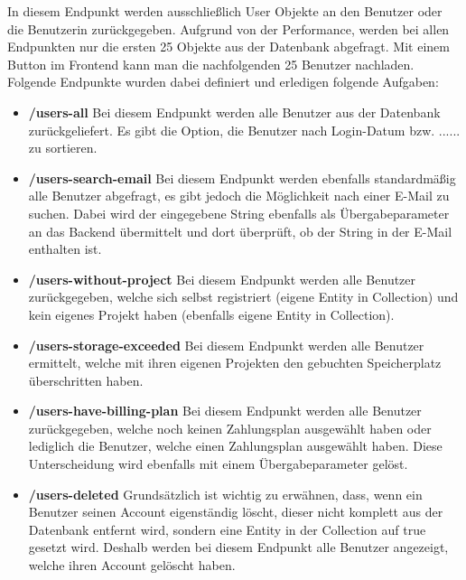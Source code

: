 In diesem Endpunkt werden ausschließlich User Objekte an den Benutzer oder die Benutzerin zurückgegeben. Aufgrund von der Performance, werden bei allen Endpunkten nur die ersten 25 Objekte aus der Datenbank abgefragt. Mit einem Button im Frontend kann man die nachfolgenden 25 Benutzer nachladen. Folgende Endpunkte wurden dabei definiert und erledigen folgende Aufgaben:
\begin{itemize}
    \item \textbf{/users-all}
        \newline
        Bei diesem Endpunkt werden alle Benutzer aus der Datenbank zurückgeliefert. Es gibt die Option, die Benutzer nach Login-Datum bzw. ...... zu sortieren.
    \item \textbf{/users-search-email}
        \newline
        Bei diesem Endpunkt werden ebenfalls standardmäßig alle Benutzer abgefragt, es gibt jedoch die Möglichkeit nach einer E-Mail zu suchen. Dabei wird der eingegebene String ebenfalls als Übergabeparameter an das Backend übermittelt und dort überprüft, ob der String in der E-Mail enthalten ist.
    \item \textbf{/users-without-project}
        \newline
        Bei diesem Endpunkt werden alle Benutzer zurückgegeben, welche sich selbst registriert (eigene Entity in Collection) und kein eigenes Projekt haben (ebenfalls eigene Entity in Collection).
    \item \textbf{/users-storage-exceeded}
        \newline
        Bei diesem Endpunkt werden alle Benutzer ermittelt, welche mit ihren eigenen Projekten den gebuchten Speicherplatz überschritten haben.
    \item \textbf{/users-have-billing-plan}
        \newline
        Bei diesem Endpunkt werden alle Benutzer zurückgegeben, welche noch keinen Zahlungsplan ausgewählt haben oder lediglich die Benutzer, welche einen Zahlungsplan ausgewählt haben. Diese Unterscheidung wird ebenfalls mit einem Übergabeparameter gelöst.
    \item \textbf{/users-deleted}
        \newline
        Grundsätzlich ist wichtig zu erwähnen, dass, wenn ein Benutzer seinen Account eigenständig löscht, dieser nicht komplett aus der Datenbank entfernt wird, sondern eine Entity in der Collection auf true gesetzt wird. Deshalb werden bei diesem Endpunkt alle Benutzer angezeigt, welche ihren Account gelöscht haben.

\end{itemize}
